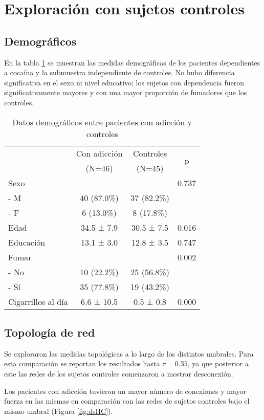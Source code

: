 \section{Exploración con sujetos controles}
\subsection{Demográficos}

En la tabla \ref{tab:demHC} se muestran las medidas demográficas de los pacientes dependientes a cocaína y la submuestra independiente de controles.
No hubo diferencia significativa en el sexo ni nivel educativo; los sujetos con dependencia fueron significativamente mayores y con una mayor proporción de fumadores que los controles.

\begin{table}[hbp]
    \centering
    \small
    \caption{Datos demográficos entre pacientes con adicción y controles}
    \label{tab:demHC}
    \begin{tabular}{lccc}
        \hline
        & Con adicción & Controles & \multirow{2}{*}{p}\\
        & (N=46) & (N=45) & \\
        \hline
        Sexo            &  &  & 0.737\\
        - M           & 40 (87.0\%) & 37 (82.2\%) & \\
        - F           & 6 (13.0\%) & 8 (17.8\%) & \\
        Edad            & 34.5 ±  7.9 & 30.5 ±  7.5 & 0.016\\
        Educación       & 13.1 ±  3.0 & 12.8 ±  3.5 & 0.747\\
        Fumar           &  &  & 0.002\\
        - No          & 10 (22.2\%) & 25 (56.8\%) & \\
        - Sí          & 35 (77.8\%) & 19 (43.2\%) & \\
        Cigarrillos al día &  6.6 ± 10.5 &  0.5 ±  0.8 & 0.000\\
        \hline
    \end{tabular}
\end{table}

\subsection{Topología de red}
Se exploraron las medidas topológicas a lo largo de los distintos umbrales.
Para esta comparación se reportan los resultados hasta $\tau = 0.35$, ya que posterior a este las redes de los sujetos controles comenzaron a mostrar desconexión.\par
Los pacientes con adicción tuvieron un mayor número de conexiones y mayor fuerza en las mismas en comparación con las redes de sujetos controles
bajo el mismo umbral (Figura \ref{fig:dsHC}).

